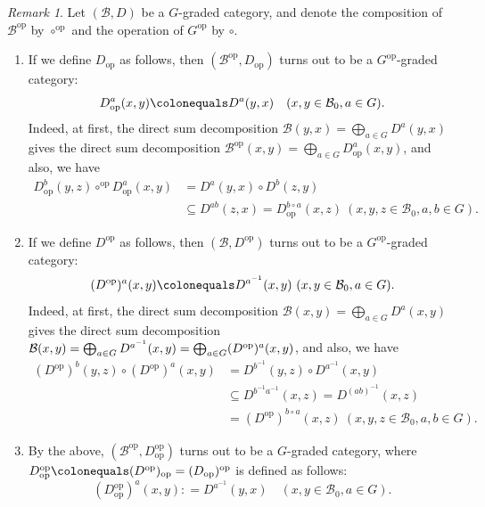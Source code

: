 \documentclass{surv-l}
\numberwithin{equation}{chapter}
\numberwithin{figure}{chapter}
\theoremstyle{plain}
\theoremstyle{definition}
\theoremstyle{remark}
\newtheorem{rmk}[thm]{Remark}
\begin{document}
\begin{rmk}\label{rmk:op-grading}
Let $(\mathcal{B}, D)$ be a $G$-graded category, and denote the composition of
$\mathcal{B}^{\mathrm{op}}$ by $\circ^{\mathrm{op}}$ and the operation of $G^{\mathrm{op}}$ by $\circ$.
\begin{enumerate}
\item
If we define $D_\mathrm{op}$ as follows,
then $(\mathcal{B}^{\mathrm{op}}, D_\mathrm{op})$ turns out to be a $G^{\mathrm{op}}$-graded category:
\[
D_\mathrm{op}^a(x, y)\colonequals  D^a(y, x)\quad (x, y \in \mathcal{B}_0, a \in G).
\]
Indeed, at first, \pagebreak
the direct sum decomposition $\mathcal{B}(y, x) = \bigoplus_{a\in G} D^a(y, x)$ gives
the direct sum decomposition $\mathcal{B}^{\mathrm{op}}(x, y) = \bigoplus_{a\in G}D_\mathrm{op}^a(x, y)$,
and also, we have
\[
\begin{aligned}
D_\mathrm{op}^b(y,z) \circ^{\mathrm{op}} D_\mathrm{op}^a(x,y) &= D^a(y,x) \circ D^b(z, y)\\
&\subseteq D^{ab}(z, x) = D_\mathrm{op}^{b \circ a}(x, z)
\ (x, y, z \in \mathcal{B}_0, a, b \in G).
\end{aligned}
\]

\item
If we define $D^{\mathrm{op}}$ as follows, then $(\mathcal{B}, D^{\mathrm{op}})$ turns out to be
a $G^{\mathrm{op}}$-graded category:
\[
(D^{\mathrm{op}})^a(x,y)\colonequals  D^{a^{-1}}(x,y) \  (x, y \in \mathcal{B}_0, a\in G).
\]
Indeed, at first, the direct sum decomposition
$\mathcal{B}(x, y) = \bigoplus_{a\in G} D^a(x, y)$ gives the direct sum decomposition
$\mathcal{B}(x, y) = \bigoplus_{a\in G}D^{a^{-1}}(x, y) = \linebreak[4]\bigoplus_{a\in G}(D^{\mathrm{op}})^a(x,y)$,
and also, we have
\[
\begin{aligned}
(D^{\mathrm{op}})^b(y,z) \circ (D^{\mathrm{op}})^a(x,y) &= D^{b^{-1}}(y,z) \circ D^{a^{-1}}(x, y)\\
&\subseteq D^{b^{-1} a^{-1}}(x, z) = D^{(ab)^{-1}}(x, z)\\
&= (D^{\mathrm{op}})^{b \circ a}(x, z)\ (x, y, z \in \mathcal{B}_0, a, b \in G).
\end{aligned}
\]

\item
By the above, $(\mathcal{B}^{\mathrm{op}}, D_\mathrm{op}^{\mathrm{op}})$ turns out to be a $G$-graded category,
where $D^{\mathrm{op}}_\mathrm{op}\colonequals  (D^{\mathrm{op}})_\mathrm{op} = (D_\mathrm{op})^{\mathrm{op}}$ is defined as follows:
\[
(D_\mathrm{op}^{\mathrm{op}})^a(x, y): = D^{a^{-1}}(y, x)\quad (x, y \in \mathcal{B}_0, a \in G).
\]
\end{enumerate}
\end{rmk}
\end{document}
